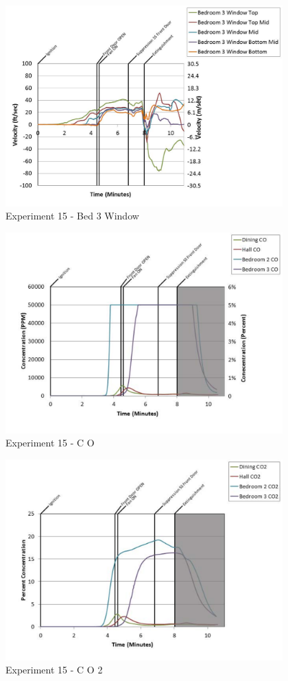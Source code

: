\documentclass{article}
\begin{document}
\begin{appendices}
	\begin{figure}[h!]
		\centering
		\includegraphics[height=3.05in]{0_Images/Results_Charts/Exp_15_Charts/Bed3Window.pdf}
		\caption{Experiment 15 - Bed 3 Window}
	\end{figure}
 
	\clearpage

	\begin{figure}[h!]
		\centering
		\includegraphics[height=3.05in]{0_Images/Results_Charts/Exp_15_Charts/CO.pdf}
		\caption{Experiment 15 - C O}
	\end{figure}
 

	\begin{figure}[h!]
		\centering
		\includegraphics[height=3.05in]{0_Images/Results_Charts/Exp_15_Charts/CO2.pdf}
		\caption{Experiment 15 - C O 2}
	\end{figure}
 

\end{appendices}
\end{document}
